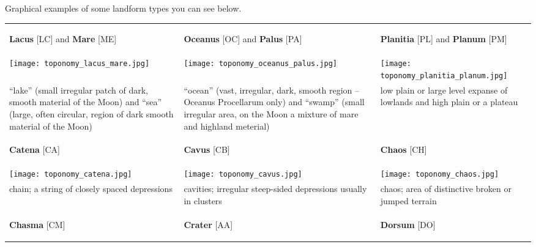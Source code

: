 Graphical examples of some landform types you can see below.

\begin{longtable}{p{45mm}|p{45mm}|p{45mm}}\toprule
\begin{center}\textbf{Lacus} [LC] and \textbf{Mare} [ME]\end{center} & \begin{center}\textbf{Oceanus} [OC] and \textbf{Palus} [PA]\end{center} & \begin{center}\textbf{Planitia} [PL] and \textbf{Planum} [PM]\end{center} \\
\texttt{[image: toponomy\_lacus\_mare.jpg]}  & \texttt{[image: toponomy\_oceanus\_palus.jpg]} & \texttt{[image: toponomy\_planitia\_planum.jpg]} \\
``lake'' (small irregular patch of dark, smooth material of the Moon) and ``sea'' (large, often circular, region of dark smooth material of the Moon) & ``ocean'' (vast, irregular, dark, smooth region -- Oceanus Procellarum only) and ``swamp'' (small irregular area, on the Moon a mixture of mare and highland meterial) & low plain or large level expanse of lowlands and high plain or a plateau \\\midrule
\begin{center}\textbf{Catena} [CA]\end{center} & \begin{center}\textbf{Cavus} [CB]\end{center} & \begin{center}\textbf{Chaos} [CH]\end{center} \\
\texttt{[image: toponomy\_catena.jpg]} & 
\texttt{[image: toponomy\_cavus.jpg]} & 
\texttt{[image: toponomy\_chaos.jpg]} \\
chain; a string of closely spaced depressions & cavities; irregular steep-sided depressions usually in clusters & chaos; area of distinctive broken or jumped terrain \\\midrule
\begin{center}\textbf{Chasma} [CM]\end{center} & \begin{center}\textbf{Crater} [AA]\end{center} & \begin{center}\textbf{Dorsum} [DO]\end{center} \\

\end{longtable}
